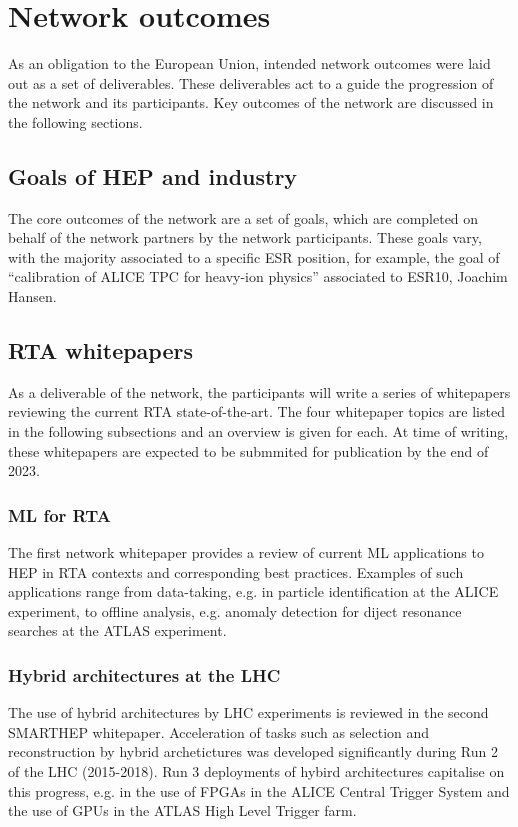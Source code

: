 \section{Network outcomes}
\label{outcomes}
As an obligation to the European Union, intended network outcomes were laid out as a set of deliverables. These deliverables act to a guide the progression of the network and its participants. Key outcomes of the network are discussed in the following sections.

\subsection{Goals of HEP and industry}
\label{goals}
The core outcomes of the network are a set of goals, which are completed on behalf of the network partners by the network participants. These goals vary, with the majority associated to a specific ESR position, for example, the goal of ``calibration of ALICE TPC for heavy-ion physics'' associated to ESR10, Joachim Hansen.

\subsection{RTA whitepapers}
\label{whitepapers}
As a deliverable of the network, the participants will write a series of whitepapers reviewing the current RTA state-of-the-art. The four whitepaper topics are listed in the following subsections and an overview is given for each. At time of writing, these whitepapers are expected to be submmited for publication by the end of 2023.

\subsubsection{ML for RTA}
\label{wp-ML-for-RTA}
The first network whitepaper provides a review of current ML applications to HEP in RTA contexts and corresponding best practices. Examples of such applications range from data-taking, e.g. in particle identification at the ALICE experiment, to offline analysis, e.g. anomaly detection for diject resonance searches at the ATLAS experiment. \cite{ALICE-PID, ATLAS-dijet} 

\subsubsection{Hybrid architectures at the LHC}
\label{wp-hybrid-architectures-LHC}
The use of hybrid architectures by LHC experiments is reviewed in the second SMARTHEP whitepaper. Acceleration of tasks such as selection and reconstruction by hybrid archetictures was developed significantly during Run 2 of the LHC (2015-2018). Run 3 deployments of hybird architectures capitalise on this progress, e.g. in the use of FPGAs in the ALICE Central Trigger System and the use of GPUs in the ATLAS High Level Trigger farm. \cite{ALICE-CTS, CMS-HLT-farm}

